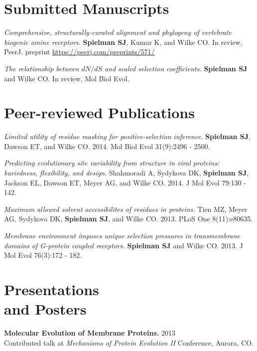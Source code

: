 \documentclass[line, margin]{res}
\begin{document}
\begin{resume}
\vspace{0.75cm}
		

\section{Submitted Manuscripts}

\emph{Comprehensive, structurally-curated alignment and phylogeny of vertebrate biogenic amine receptors.} \textbf{Spielman SJ}, Kumar K, and Wilke CO. In review, PeerJ. preprint \url{https://peerj.com/preprints/571/}


\emph{The relationship between $dN/dS$ and scaled selection coefficients.} \textbf{Spielman SJ} and Wilke CO. In review, Mol Biol Evol.

\vspace{0.75cm}

\section{Peer-reviewed Publications}

\emph{Limited utility of residue masking for positive-selection inference.} \textbf{Spielman SJ}, Dawson ET, and Wilke CO. 2014. Mol Biol Evol 31(9):2496 - 2500.

\emph{Predicting evolutionary site variability from structure in viral proteins: buriedness, flexibility, and design.} Shahmoradi A, Sydykova DK, \textbf{Spielman SJ}, Jackson EL, Dawson ET, Meyer AG, and Wilke CO. 2014. J Mol Evol 79:130 - 142.

\emph{Maximum allowed solvent accessibilites of residues in proteins.} Tien MZ, Meyer AG, Sydykova DK, \textbf{Spielman SJ}, and Wilke CO. 2013. PLoS One 8(11):e80635.

\emph{Membrane environment imposes unique selection pressures in transmembrane domains of G-protein coupled receptors.} \textbf{Spielman SJ} and Wilke CO. 2013. J Mol Evol 76(3):172 - 182.

\vspace{0.75cm}


\section{Presentations \\ and Posters}

\textbf{Molecular Evolution of Membrane Proteins.} \hfill 2013 \\ Contributed talk at \emph{Mechanisms of Protein Evolution II} Conference, Aurora, CO.


\end{resume}
\end{document}
